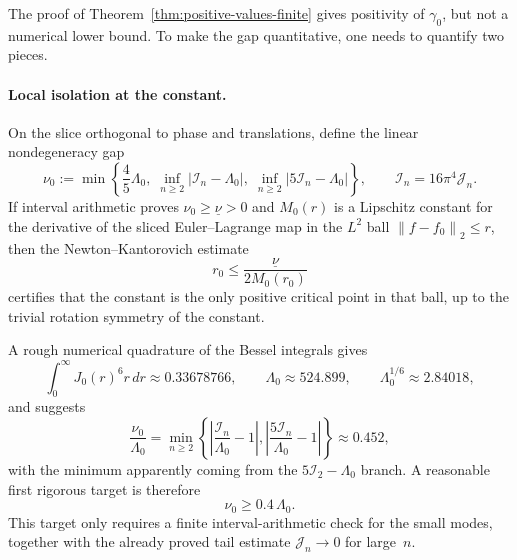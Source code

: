 \documentclass[12pt]{article}
\theoremstyle{definition}
\theoremstyle{remark}
\newcommand{\abs}[1]{\left|#1\right|}
\newcommand{\norm}[1]{\left\|#1\right\|}
\begin{document}
The proof of Theorem~\ref{thm:positive-values-finite} gives positivity of
$\gamma_0$, but not a numerical lower bound.  To make the gap quantitative,
one needs to quantify two pieces.

\paragraph{Local isolation at the constant.}
On the slice orthogonal to phase and translations, define the linear
nondegeneracy gap
\[
  \nu_0:=
  \min\left\{
    \frac45\Lambda_0,\;
    \inf_{n\geq2}\abs{\mathcal I_n-\Lambda_0},\;
    \inf_{n\geq2}\abs{5\mathcal I_n-\Lambda_0}
  \right\},
  \qquad
  \mathcal I_n=16\pi^4\mathcal J_n.
\]
If interval arithmetic proves $\nu_0\geq\underline\nu>0$ and
$M_0(r)$ is a Lipschitz constant for the derivative of the sliced
Euler--Lagrange map in the $L^2$ ball
$\norm{f-f_0}_2\leq r$, then the Newton--Kantorovich estimate
\[
  r_0\leq \frac{\underline\nu}{2M_0(r_0)}
\]
certifies that the constant is the only positive critical point in that
ball, up to the trivial rotation symmetry of the constant.

A rough numerical quadrature of the Bessel integrals gives
\[
  \int_0^\infty J_0(r)^6r\,dr \approx 0.33678766,\qquad
  \Lambda_0\approx 524.899,\qquad
  \Lambda_0^{1/6}\approx 2.84018,
\]
and suggests
\[
  \frac{\nu_0}{\Lambda_0}
  =
  \min_{n\geq2}
  \left\{
    \abs{\frac{\mathcal I_n}{\Lambda_0}-1},
    \abs{\frac{5\mathcal I_n}{\Lambda_0}-1}
  \right\}
  \approx
  0.452,
\]
with the minimum apparently coming from the $5\mathcal I_2-\Lambda_0$
branch.  A reasonable first rigorous target is therefore
\begin{equation}\label{eq:nu-target}
  \nu_0\geq 0.4\,\Lambda_0.
\end{equation}
This target only requires a finite interval-arithmetic check for the
small modes, together with the already proved tail estimate
$\mathcal J_n\to0$ for large~$n$.
\end{document}

